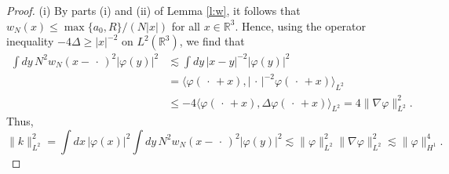 \documentclass[a4paper,11pt]{article}
\newcommand{\R}{\mathds{R}}
\begin{document}
\begin{proof}
  (i) By parts (i) and (ii) of Lemma \ref{l:w}, it follows that $w_N(x) \le
  \max\{a_0,R\} /(N|x|)$ for all $x \in \R^3$. Hence, using the operator
  inequality $-4 \Delta \ge |x|^{-2}$ on $L^2(\R^3)$, we find that
  \begin{equation}
    \begin{aligned}
      \int dy \, N^2 w_N(x-\,\cdot\,)^2 |\varphi(y)|^2 & \apprle \int dy \,
      |x-y|^{-2} |\varphi(y)|^2 \\
      & = \langle \varphi(\,\cdot\,+x), |\,\cdot\,|^{-2} \varphi(\,\cdot\,+x)
      \rangle_{L^2} \\
      & \le -4 \langle \varphi(\,\cdot\,+x), \Delta \varphi(\,\cdot\,+x)
      \rangle_{L^2} = 4 \| \nabla \varphi \|_{L^2}^2.
    \end{aligned}
    \label{w}
  \end{equation}
  Thus,
  \begin{displaymath}
    \| k \|_{L^2}^2 = \int dx \, |\varphi(x)|^2 \int dy \, N^2
    w_N(x-\,\cdot\,)^2 |\varphi(y)|^2 \apprle \| \varphi \|_{L^2}^2 \| \nabla
    \varphi \|_{L^2}^2 \apprle \| \varphi \|_{H^1}^4.
  \end{displaymath}



\end{proof}
\end{document}
